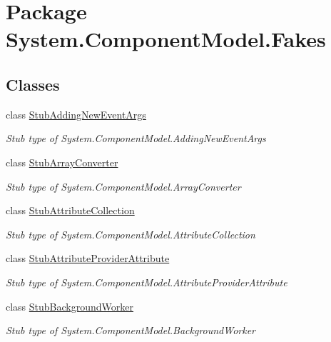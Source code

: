 \hypertarget{namespace_system_1_1_component_model_1_1_fakes}{\section{Package System.\-Component\-Model.\-Fakes}
\label{namespace_system_1_1_component_model_1_1_fakes}
}
\subsection*{Classes}
\begin{DoxyCompactItemize}
\item 
class \hyperlink{class_system_1_1_component_model_1_1_fakes_1_1_stub_adding_new_event_args}{Stub\-Adding\-New\-Event\-Args}
\begin{DoxyCompactList}\small\item\em Stub type of System.\-Component\-Model.\-Adding\-New\-Event\-Args\end{DoxyCompactList}\item 
class \hyperlink{class_system_1_1_component_model_1_1_fakes_1_1_stub_array_converter}{Stub\-Array\-Converter}
\begin{DoxyCompactList}\small\item\em Stub type of System.\-Component\-Model.\-Array\-Converter\end{DoxyCompactList}\item 
class \hyperlink{class_system_1_1_component_model_1_1_fakes_1_1_stub_attribute_collection}{Stub\-Attribute\-Collection}
\begin{DoxyCompactList}\small\item\em Stub type of System.\-Component\-Model.\-Attribute\-Collection\end{DoxyCompactList}\item 
class \hyperlink{class_system_1_1_component_model_1_1_fakes_1_1_stub_attribute_provider_attribute}{Stub\-Attribute\-Provider\-Attribute}
\begin{DoxyCompactList}\small\item\em Stub type of System.\-Component\-Model.\-Attribute\-Provider\-Attribute\end{DoxyCompactList}\item 
class \hyperlink{class_system_1_1_component_model_1_1_fakes_1_1_stub_background_worker}{Stub\-Background\-Worker}
\begin{DoxyCompactList}\small\item\em Stub type of System.\-Component\-Model.\-Background\-Worker\end{DoxyCompactList}\item 

\end{DoxyCompactItemize}
